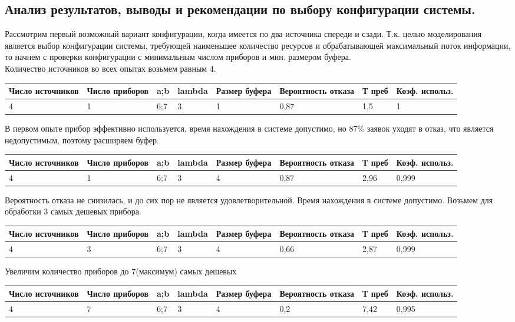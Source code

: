 \documentclass{article}
\begin{document}
	\subsection{Анализ результатов, выводы и рекомендации по выбору конфигурации системы.}
	Рассмотрим первый возможный вариант конфигурации, когда имеется по два источника спереди и сзади.
	Т.к. целью моделирования является выбор конфигурации
	системы, требующей наименьшее количество ресурсов и
	обрабатывающей максимальный поток информации, то начнем с проверки конфигурации с минимальным числом приборов и мин. размером буфера.\\
	Количество источников во всех опытах возьмем равным 4.
	\begin{tabular}{|p{2.1cm}|p{2.1cm}|p{0.5cm}|p{2.1cm}|p{2.1cm}|p{2.1cm}|p{2.1cm}|p{2.1cm}|}
		\hline
		Число источников&Число приборов&a;b&lambda&Размер буфера&Вероятность отказа&Т преб&Коэф. использ.\\ \hline
		4&1&6;7&3&1&0,87&1,5&1\\ \hline
	\end{tabular}
	В первом опыте прибор эффективно используется, время нахождения в системе допустимо, но 87\% заявок уходят в отказ, что является недопустимым, поэтому расширяем буфер.
	\begin{tabular}{|p{2.1cm}|p{2.1cm}|p{0.5cm}|p{2.1cm}|p{2.1cm}|p{2.1cm}|p{2.1cm}|p{2.1cm}|}
		\hline
		Число источников&Число приборов&a;b&lambda&Размер буфера&Вероятность отказа&Т преб&Коэф. использ.\\ \hline
		4&1&6;7&3&4&0,87&2,96&0,999\\ \hline
	\end{tabular}
	Вероятность отказа не снизилась, и до сих пор не является удовлетворительной. Время нахождения в системе допустимо. Возьмем для обработки 3 самых дешевых прибора.
	\begin{tabular}{|p{2.1cm}|p{2.1cm}|p{0.5cm}|p{2.1cm}|p{2.1cm}|p{2.1cm}|p{2.1cm}|p{2.1cm}|}
		\hline
		Число источников&Число приборов&a;b&lambda&Размер буфера&Вероятность отказа&Т преб&Коэф. использ.\\ \hline
		4&3&6;7&3&4&0,66&2,87&0,999\\ \hline
	\end{tabular}
	Увеличим количество приборов до 7(максимум) самых дешевых
	\begin{tabular}{|p{2.1cm}|p{2.1cm}|p{0.5cm}|p{2.1cm}|p{2.1cm}|p{2.1cm}|p{2.1cm}|p{2.1cm}|}
		\hline
		Число источников&Число приборов&a;b&lambda&Размер буфера&Вероятность отказа&Т преб&Коэф. использ.\\ \hline
		4&7&6;7&3&4&0,2&7,42&0,995\\ \hline
	\end{tabular}
\end{document}
